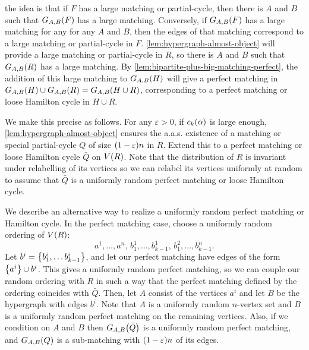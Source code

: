 \documentclass[11pt,english]{article}
\theoremstyle{plain}
\theoremstyle{definition}
\theoremstyle{definition}
\theoremstyle{plain}
\theoremstyle{plain}
\theoremstyle{plain}
\theoremstyle{plain}
\theoremstyle{remark}
\theoremstyle{remark}
\let\originalleft\left
\let\originalright\right
\renewcommand{\left}{\mathopen{}\mathclose\bgroup\originalleft}
\renewcommand{\right}{\aftergroup\egroup\originalright}
\begin{document}
the idea is that if $F$ has a large matching or partial-cycle, then there
is $A$ and $B$ such that $G_{A,B}\left(F\right)$ has a large matching. Conversely,
if $G_{A,B}\left(F\right)$ has a large matching for any for any $A$
and $B$, then the edges of that matching correspond to a large matching or partial-cycle in $F$. \ref{lem:hypergraph-almost-object}
will provide a large matching or partial-cycle in $R$, so there is $A$
and $B$ such that $G_{A,B}\left(R\right)$ has a large matching.
By \ref{lem:bipartite-plus-big-matching-perfect}, the addition of
this large matching to $G_{A,B}\left(H\right)$ will give a perfect
matching in $G_{A,B}\left(H\right)\cup G_{A,B}\left(R\right)=G_{A,B}\left(H\cup R\right)$,
corresponding to a perfect matching or loose Hamilton cycle in $H\cup R$.

We make this precise as follows. For any $\varepsilon>0$, if $\chyp\left(\alpha\right)$
is large enough, \ref{lem:hypergraph-almost-object} ensures the a.a.s.
existence of a matching or special partial-cycle $Q$ of size $\left(1-\varepsilon\right)n$
in $R$. Extend this to a perfect matching or loose Hamilton cycle
$\bar{Q}$ on $V\left(R\right)$. Note that the distribution of $R$
is invariant under relabelling of its vertices so we can relabel its
vertices uniformly at random to assume that $\bar{Q}$ is a uniformly
random perfect matching or loose Hamilton cycle.

We describe an alternative way to realize a uniformly random perfect
matching or Hamilton cycle. In the perfect matching case, choose a
uniformly random ordering of $V\left(R\right)$: 
\[
a^{1},\dots,a^{n},\, b_{1}^{1},\dots,b_{k-1}^{1},\, b_{1}^{2},\dots,b_{k-1}^{n}.
\]
Let $b^{i}=\left\{ b_{1}^{i},\dots b_{k-1}^{i}\right\}$, and let our perfect matching have edges of the form $\left\{a^{i}\right\}\cup b^i $.
This gives a uniformly random perfect matching, so we can couple our
random ordering with $R$ in such a way that the perfect matching
defined by the ordering coincides with $\bar{Q}$. Then, let $A$
consist of the vertices $a^{i}$ and let $B$ be the hypergraph with
edges $b^i$.
Note that $A$ is a uniformly random $n$-vertex set and $B$ is a
uniformly random perfect matching on the remaining vertices. Also,
if we condition on $A$ and $B$ then $G_{A,B}\left(\bar{Q}\right)$
is a uniformly random perfect matching, and $G_{A,B}\left(Q\right)$
is a sub-matching with $\left(1-\varepsilon\right)n$ of its edges.
\end{document}
